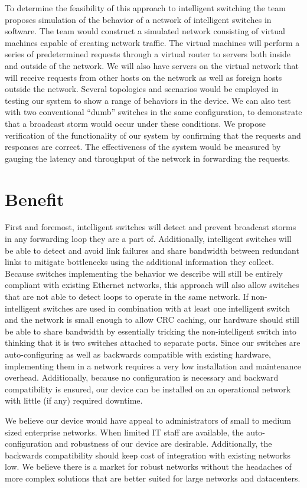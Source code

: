 \documentclass{article}
\begin{document}
	To determine the feasibility of this approach to intelligent switching the team proposes simulation of the behavior of a network of intelligent switches in software.
	The team would construct a simulated network consisting of virtual machines capable of creating network traffic.
	The virtual machines will perform a series of predetermined requests through a virtual router to servers both inside and outside of the network.
	We will also have servers on the virtual network that will receive requests from other hosts on the network as well as foreign hosts outside the network.
	Several topologies and scenarios would be employed in testing our system to show a range of behaviors in the device.
	We can also test with two conventional ``dumb'' switches in the same configuration, to demonstrate that a broadcast storm would occur under these conditions.
	We propose verification of the functionality of our system by confirming that the requests and responses are correct.
	The effectiveness of the system would be measured by gauging the latency and throughput of the network in forwarding the requests.
\section{Benefit}
  First and foremost, intelligent switches will detect and prevent broadcast storms in any forwarding loop they are a part of.
	Additionally, intelligent switches will be able to detect and avoid link failures and share bandwidth between redundant links to mitigate bottlenecks using the additional information they collect.
	Because switches implementing the behavior we describe will still be entirely compliant with existing Ethernet networks, this approach will also allow switches that are not able to detect loops to operate in the same network.
	If non-intelligent switches are used in combination with at least one intelligent switch and the network is small enough to allow CRC caching, our hardware should still be able to share bandwidth by essentially tricking the non-intelligent switch into thinking that it is two switches attached to separate ports.
	Since our switches are auto-configuring as well as backwards compatible with existing hardware, implementing them in a network requires a very low installation and maintenance overhead.
	Additionally, because no configuration is necessary and backward compatibility is ensured, our device can be installed on an operational network with little (if any) required downtime.
	
	We believe our device would have appeal to administrators of small to medium sized enterprise networks.
	When limited IT staff are available, the auto-configuration and robustness of our device are desirable.
	Additionally, the backwards compatibility should keep cost of integration with existing networks low.
	We believe there is a market for robust networks without the headaches of more complex solutions that are better suited for large networks and datacenters.
\end{document}
